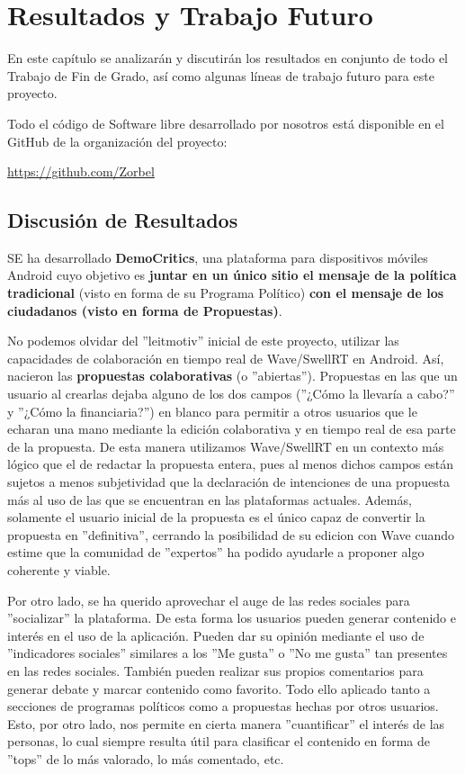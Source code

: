 \newpage
\thispagestyle{sectioned}
\chapter{Resultados y Trabajo Futuro}

En este capítulo se analizarán y discutirán los resultados en conjunto de todo el Trabajo de Fin de Grado, así como algunas líneas de trabajo futuro para este proyecto.

Todo el código de Software libre desarrollado por nosotros está disponible en el GitHub de la organización del proyecto:

\url{https://github.com/Zorbel}

\section{Discusión de Resultados}

SE ha desarrollado \textbf{DemoCritics}, una plataforma para dispositivos móviles Android cuyo objetivo es \textbf{juntar en un único sitio el mensaje de la política tradicional} (visto en forma de su Programa Político) \textbf{con el mensaje de los ciudadanos (visto en forma de Propuestas)}.

No podemos olvidar del ''leitmotiv'' inicial de este proyecto, utilizar las capacidades de colaboración en tiempo real de Wave/SwellRT en Android. Así, nacieron las \textbf{propuestas colaborativas} (o ''abiertas''). Propuestas en las que un usuario al crearlas dejaba alguno de los dos campos (''¿Cómo la llevaría a cabo?'' y ''¿Cómo la financiaria?'') en blanco para permitir a otros usuarios que le echaran una mano mediante la edición colaborativa y en tiempo real de esa parte de la propuesta. De esta manera utilizamos Wave/SwellRT en un contexto más lógico que el de redactar la propuesta entera, pues al menos dichos campos están sujetos a menos subjetividad que la declaración de intenciones de una propuesta más al uso de las que se encuentran en las plataformas actuales. Además, solamente el usuario inicial de la propuesta es el único capaz de convertir la propuesta en ''definitiva'', cerrando la posibilidad de su edicion con Wave cuando estime que la comunidad de ''expertos'' ha podido ayudarle a proponer algo coherente y viable. 

Por otro lado, se ha querido aprovechar el auge de las redes sociales para ''socializar'' la plataforma. De esta forma los usuarios pueden generar contenido e interés en el uso de la aplicación. Pueden dar su opinión mediante el uso de ''indicadores sociales'' similares a los ''Me gusta'' o ''No me gusta'' tan presentes en las redes sociales. También pueden realizar sus propios comentarios para generar debate y marcar contenido como favorito. Todo ello aplicado tanto a secciones de programas políticos como a propuestas hechas por otros usuarios. Esto, por otro lado, nos permite en cierta manera ''cuantificar'' el interés de las personas, lo cual siempre resulta útil para clasificar el contenido en forma de ''tops'' de lo más valorado, lo más comentado, etc. 

